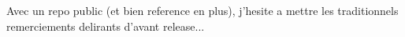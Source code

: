 Avec un repo public (et bien reference en plus), j'hesite a mettre les traditionnels remerciements delirants d'avant release...